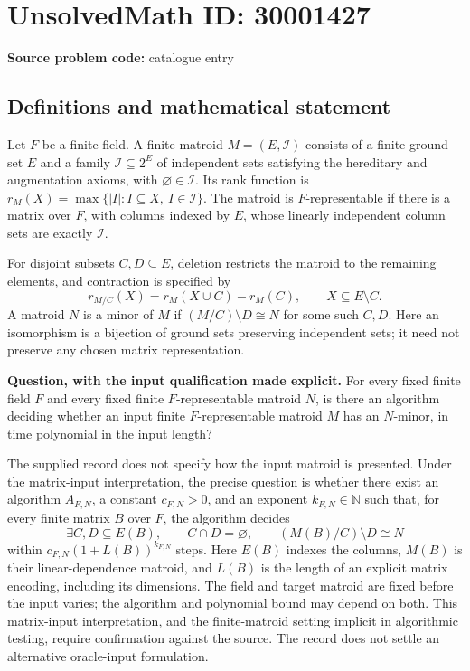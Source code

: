 \documentclass[11pt]{article}
\newcommand{\N}{\mathbb{N}}
\begin{document}
\section*{UnsolvedMath ID: 30001427}
\textbf{Source problem code:} catalogue entry
\subsection{Definitions and mathematical statement}
Let \(F\) be a finite field. A finite matroid \(M=(E,\mathcal I)\) consists of a finite ground set \(E\) and a family \(\mathcal I\subseteq 2^E\) of independent sets satisfying the hereditary and augmentation axioms, with \(\varnothing\in\mathcal I\). Its rank function is \(r_M(X)=\max\{|I|:I\subseteq X,\ I\in\mathcal I\}\). The matroid is \(F\)-representable if there is a matrix over \(F\), with columns indexed by \(E\), whose linearly independent column sets are exactly \(\mathcal I\).

For disjoint subsets \(C,D\subseteq E\), deletion restricts the matroid to the remaining elements, and contraction is specified by
\[
r_{M/C}(X)=r_M(X\cup C)-r_M(C),\qquad X\subseteq E\setminus C.
\]
A matroid \(N\) is a minor of \(M\) if \((M/C)\setminus D\cong N\) for some such \(C,D\). Here an isomorphism is a bijection of ground sets preserving independent sets; it need not preserve any chosen matrix representation.

\textbf{Question, with the input qualification made explicit.} For every fixed finite field \(F\) and every fixed finite \(F\)-representable matroid \(N\), is there an algorithm deciding whether an input finite \(F\)-representable matroid \(M\) has an \(N\)-minor, in time polynomial in the input length?

The supplied record does not specify how the input matroid is presented. Under the matrix-input interpretation, the precise question is whether there exist an algorithm \(A_{F,N}\), a constant \(c_{F,N}>0\), and an exponent \(k_{F,N}\in\N\) such that, for every finite matrix \(B\) over \(F\), the algorithm decides
\[
\exists C,D\subseteq E(B),\qquad C\cap D=\varnothing,\qquad
(M(B)/C)\setminus D\cong N
\]
within \(c_{F,N}(1+L(B))^{k_{F,N}}\) steps. Here \(E(B)\) indexes the columns, \(M(B)\) is their linear-dependence matroid, and \(L(B)\) is the length of an explicit matrix encoding, including its dimensions. The field and target matroid are fixed before the input varies; the algorithm and polynomial bound may depend on both. This matrix-input interpretation, and the finite-matroid setting implicit in algorithmic testing, require confirmation against the source. The record does not settle an alternative oracle-input formulation.
\end{document}
